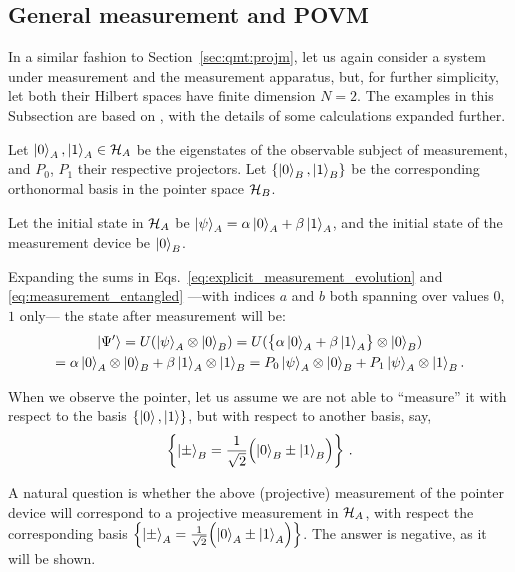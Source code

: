 \subsection{General measurement and POVM}
\label{subsec:POVM}

In a similar fashion to
Section~\ref{sec:qmt:projm},
let us again consider
a system under measurement
and the measurement apparatus,
but, for further simplicity, let both their Hilbert spaces have finite dimension $N=2$.
%
The examples in this Subsection are based on \citereset\cite[.2]{PreskillNotes},
with the details of some calculations expanded further. 

Let $\ket{0}_A, \ket{1}_A \in \mathcal{H}_A$ be the eigenstates
of the observable subject of measurement,
and $P_0$, $P_1$ their respective projectors.
Let $\qty{\ket{0}_B, \ket{1}_B}$ be the corresponding orthonormal basis in the pointer space $\mathcal{H}_B$.

Let the initial state in $\mathcal{H}_A$ be $\ket{\psi}_A = \alpha\ket{0}_A + \beta\ket{1}_A$,
and the initial state of the measurement device be $\ket{0}_B$.

Expanding the sums in Eqs.~\eqref{eq:explicit_measurement_evolution}
and \eqref{eq:measurement_entangled}
---with indices $a$ and $b$ both spanning over values $0$, $1$ only---
the state after measurement will be:
\begin{multline}\label{eq:qubit_ortho_measurement}
        \ket{\Psi'}
    = U( \ket{\psi}_A \otimes \ket{0}_B )
    = U( \qty\big{\alpha\ket{0}_A + \beta\ket{1}_A} \otimes \ket{0}_B )
    \\
    = \alpha\ket{0}_A \otimes \ket{0}_B + \beta\ket{1}_A  \otimes \ket{1}_B
    = P_0\ket{\psi}_A \otimes \ket{0}_B + P_1\ket{\psi}_A \otimes \ket{1}_B \text{.}
\end{multline}

When we observe the pointer, let us assume we are not
able to ``measure'' it with respect to the basis
$\left\{\ket{0}, \ket{1}\right\}$,
but with respect to another basis, say,
\begin{equation}\label{eq:pmbasis}
\left\{\ket{\pm}_B = \frac{1}{\sqrt{2}} \qty\Big(\ket{0}_B \pm \ket{1}_B)\right\} \,\text{.}
\end{equation}

A natural question is whether the above (projective) measurement
of the pointer device
will correspond to a projective
measurement in $\mathcal{H}_A$,
with respect the corresponding basis
$\left\{\ket{\pm}_A = \frac{1}{\sqrt{2}} \qty\Big(\ket{0}_A \pm \ket{1}_A)\right\}$.
The answer is negative, as it will be shown.

